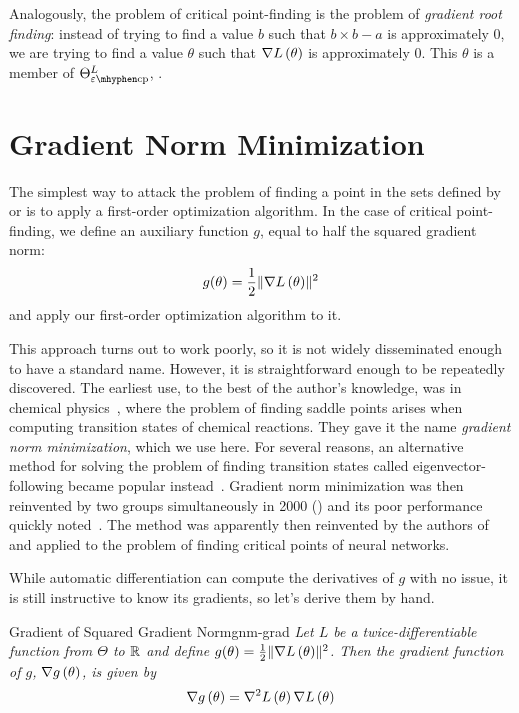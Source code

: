 \documentclass[../../thesis.tex]{subfiles}
\begin{document}
Analogously, the problem of critical point-finding
is the problem of \emph{gradient root finding}:
instead of trying to find a value $b$ such that
$b\times b - a$
is approximately $0$,
we are trying to find a value $\theta$ such that
$\nabla L\left(\theta\right)$
is approximately $0$.
This $\theta$ is a member of $\Theta^L_{\ecp}$,
.

\section{Gradient Norm Minimization}

The simplest way to attack the problem
of finding a point in
the sets defined by  or 
is to apply a first-order optimization algorithm.
In the case of critical point-finding,
we define an auxiliary function $g$,
equal to half the squared gradient norm:
\begin{equation}\equationlabel{def-g}
	g(\theta) = \frac{1}{2}\sgn{L}{\theta}
\end{equation}
\noindent and apply our first-order optimization algorithm to it.

This approach turns out to work poorly,
so it is not widely disseminated enough to have a standard name.
However, it is straightforward enough to be repeatedly discovered.
The earliest use, to the best of the author's knowledge,
was in chemical physics~\cite{mciver1972},
where the problem of finding saddle points arises
when computing transition states of chemical reactions.
They gave it the name \emph{gradient norm minimization},
which we use here.
For several reasons, an alternative method
for solving the problem of finding transition states
called eigenvector-following became popular instead~\cite{cerjan1981}.
Gradient norm minimization was then reinvented by two groups simultaneously in 2000
(\cite{angelani2000,broderix2000})
and its poor performance quickly noted~\cite{doye2002}.
The method was apparently then reinvented by the authors of%
~\cite{pennington2017}
and applied to the problem of finding critical points of neural networks.

While automatic differentiation can compute the derivatives of $g$ with no issue,
it is still instructive to know its gradients,
so let's derive them by hand.

\begin{theorem}{Gradient of Squared Gradient Norm}{gnm-grad}
	\emph{Let $L$ be a twice-differentiable function
	from $\Theta$ to $\mathbb{R}$
	and define $g(\theta) = \frac{1}{2}\lVert\nabla L\left(\theta\right)\rVert^2$.
	Then the gradient function of $g$, $\nabla g\left(\theta\right)$,
	is given by
	\begin{equation}
		\nabla g\left(\theta\right) = \nabla^2L\left(\theta\right)\nabla L\left(\theta\right)
	\end{equation}
	}
\end{theorem}
\end{document}
